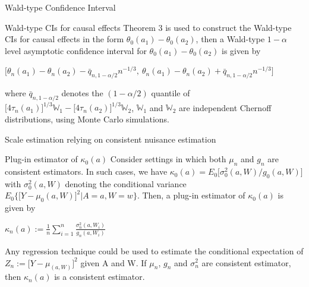 \documentclass{beamer}
\newcommand{\sn}{\sum_{i=1}^n}
\begin{document}

\begin{frame}{Wald-type Confidence Interval}

\begin{block}{Wald-type CIs for causal effects}
	Theorem 3 is used to construct the Wald-type CIs for causal effects in the form $\theta_0(a_1)-\theta_0(a_2)$, then a Wald-type $1-\alpha$ level asymptotic confidence interval for $\theta_0(a_1)-\theta_0(a_2)$ is given by
	\begin{center}
	$\Big[ \theta_n(a_1)-\theta_n(a_2) - \bar{q}_{n,1-\alpha/2}n^{-1/3}, \ \theta_n(a_1)-\theta_n(a_2) + \bar{q}_{n,1-\alpha/2}n^{-1/3} \Bigg] $
	\end{center}
	where $\bar{q}_{n,1-\alpha/2}$ denotes the $(1-\alpha/2)$ quantile of $\big[4\tau_n(a_1)\big]^{1/3} \mathbb{W}_1 - \big[4\tau_n(a_2)\big]^{1/3} \mathbb{W}_2$, $\mathbb{W}_1$ and $\mathbb{W}_2$ are independent Chernoff distributions, using Monte Carlo simulations.
\end{block}

\end{frame}



\begin{frame}{Scale estimation relying on consistent nuisance estimation}

\begin{block}{Plug-in estimator of $\kappa_0(a)$}
	Consider settings in which both $\mu_n$ and $g_n$ are consistent estimators. In such cases, we have $\kappa_0(a)=E_0\big[ \sigma_0^2(a,W)/g_0(a,W)\big]$ with $\sigma^2_0(a,W)$ denoting the conditional variance $E_0\lbrace  \big[ Y - \mu_0(a,W) \big]^2 | A=a,W=w \rbrace$. Then, a plug-in estimator of $\kappa_0(a)$ is given by
	\begin{center}
	$\kappa_n(a):=\frac{1}{n}\sn \frac{\sigma_n^2(a,W_i)}{g_n(a,W_i)}$
	\end{center}
	 Any regression technique could be used to estimate the conditional expectation of $Z_n:= \big[ Y - \mu_(a,W) \big]^2$ given A and W. If $\mu_n$, $g_n$ and $\sigma_n^2$ are consistent estimator, then $\kappa_n(a)$ is a consistent estimator.
\end{block}

\end{frame}
\end{document}
